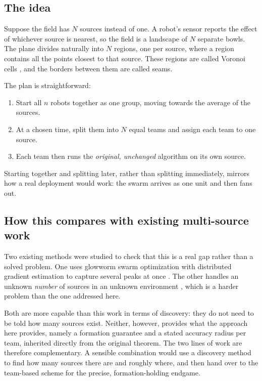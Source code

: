 \documentclass[11pt,a4paper]{article}
\begin{document}
\subsection{The idea}

Suppose the field has $N$ sources instead of one. A robot's sensor reports the effect of whichever
source is nearest, so the field is a landscape of $N$ separate bowls. The plane divides naturally
into $N$ regions, one per source, where a region contains all the points closest to that source.
These regions are called Voronoi cells \cite{cortes2004}, and the borders between them are called
seams.

The plan is straightforward:

\begin{enumerate}
    \item Start all $n$ robots together as one group, moving towards the average of the sources.
    \item At a chosen time, split them into $N$ equal teams and assign each team to one source.
    \item Each team then runs the \emph{original, unchanged} algorithm on its own source.
\end{enumerate}

Starting together and splitting later, rather than splitting immediately, mirrors how a real
deployment would work: the swarm arrives as one unit and then fans out.

\subsection{How this compares with existing multi-source work}

Two existing methods were studied to check that this is a real gap rather than a solved problem. One
uses glowworm swarm optimization with distributed gradient estimation to capture several peaks at
once \cite{turgeman2018}. The other handles an unknown \emph{number} of sources in an unknown
environment \cite{chen2025dias}, which is a harder problem than the one addressed here.

Both are more capable than this work in terms of discovery: they do not need to be told how many
sources exist. Neither, however, provides what the approach here provides, namely a formation
guarantee and a stated accuracy radius per team, inherited directly from the original theorem. The
two lines of work are therefore complementary. A sensible combination would use a discovery method
to find how many sources there are and roughly where, and then hand over to the team-based scheme for
the precise, formation-holding endgame.
\end{document}
